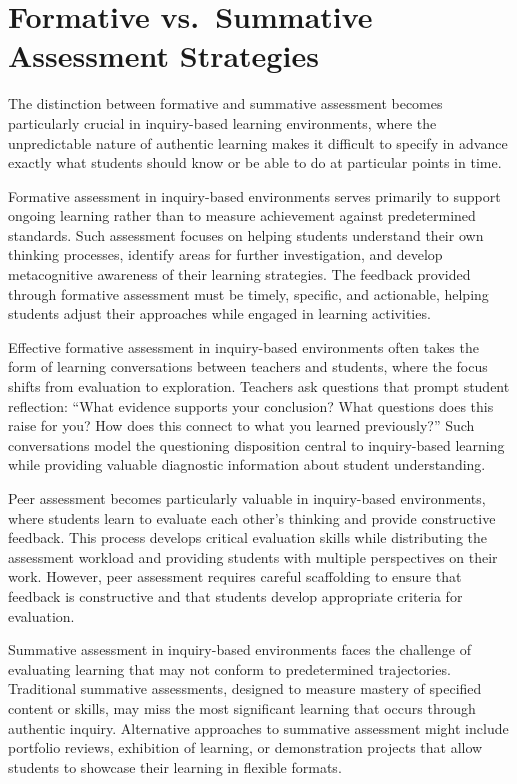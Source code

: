 \documentclass[
  Letterpaper,
]{scrbook}
\begin{document}
\section{Formative vs.~Summative Assessment
Strategies}\label{formative-vs.-summative-assessment-strategies}

The distinction between formative and summative assessment becomes
particularly crucial in inquiry-based learning environments, where the
unpredictable nature of authentic learning makes it difficult to specify
in advance exactly what students should know or be able to do at
particular points in time.

Formative assessment in inquiry-based environments serves primarily to
support ongoing learning rather than to measure achievement against
predetermined standards. Such assessment focuses on helping students
understand their own thinking processes, identify areas for further
investigation, and develop metacognitive awareness of their learning
strategies. The feedback provided through formative assessment must be
timely, specific, and actionable, helping students adjust their
approaches while engaged in learning activities.

Effective formative assessment in inquiry-based environments often takes
the form of learning conversations between teachers and students, where
the focus shifts from evaluation to exploration. Teachers ask questions
that prompt student reflection: ``What evidence supports your
conclusion? What questions does this raise for you? How does this
connect to what you learned previously?'' Such conversations model the
questioning disposition central to inquiry-based learning while
providing valuable diagnostic information about student understanding.

Peer assessment becomes particularly valuable in inquiry-based
environments, where students learn to evaluate each other's thinking and
provide constructive feedback. This process develops critical evaluation
skills while distributing the assessment workload and providing students
with multiple perspectives on their work. However, peer assessment
requires careful scaffolding to ensure that feedback is constructive and
that students develop appropriate criteria for evaluation.

Summative assessment in inquiry-based environments faces the challenge
of evaluating learning that may not conform to predetermined
trajectories. Traditional summative assessments, designed to measure
mastery of specified content or skills, may miss the most significant
learning that occurs through authentic inquiry. Alternative approaches
to summative assessment might include portfolio reviews, exhibition of
learning, or demonstration projects that allow students to showcase
their learning in flexible formats.
\end{document}
